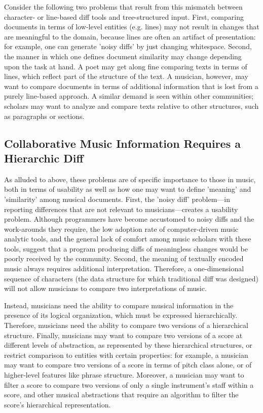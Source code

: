 \documentclass{article}
\begin{document}
Consider the following two problems that result from this mismatch
between character- or line-based diff tools and tree-structured input.
First, comparing documents in terms of low-level entities
(e.g. lines) may not result in changes that are meaningful to the
domain, because lines are often an artifact of presentation: for
example, one can generate 'noisy diffs' by just changing whitespace.
Second, the manner in which one defines document similarity may change
depending upon the task at hand.  A poet may get along fine comparing
texts in terms of lines, which reflect part of the structure of the
text.  A musician, however, may want to compare documents in terms of
additional information that is lost from a purely line-based approach.
A similar demand is seen within other communities; scholars may want
to analyze and compare texts relative to other structures, such as
paragraphs or sections.

\subsection{Collaborative Music Information Requires a Hierarchic Diff}
As alluded to above, these problems are of specific importance to
those in music, both in terms of usability as well as how one may want
to define 'meaning' and 'similarity' among musical documents.  First,
the 'noisy diff' problem---in reporting differences that are not
relevant to musicians---creates a usability problem.  Although
programmers have become accustomed to noisy diffs and the work-arounds
they require, the low adoption rate of computer-driven music analytic
tools, and the general lack of comfort among music scholars with these
tools, suggest that a program producing diffs of meaningless changes
would be poorly received by the community.  Second, the meaning of
textually encoded music always requires additional interpretation.
Therefore, a one-dimensional sequence of characters (the data
structure for which traditional diff was designed) will not allow
musicians to compare two interpretations of music.  

Instead, musicians need the ability to compare musical information in
the presence of its logical organization, which must be expressed
hierarchically.  Therefore, musicians need the ability to compare two
versions of a hierarchical structure.  Finally, musicians may want to
compare two versions of a score at different levels of abstraction, as
represented by these hierarchical structures, or restrict comparison
to entities with certain properties: for example, a musician may want
to compare two versions of a score in terms of pitch class alone, or
of higher-level features like phrase structure. Moreover, a musician
may want to filter a score to compare two versions of only a single
instrument's staff within a score, and other musical abstractions that
require an algorithm to filter the score's hierarchical
representation.
\end{document}

